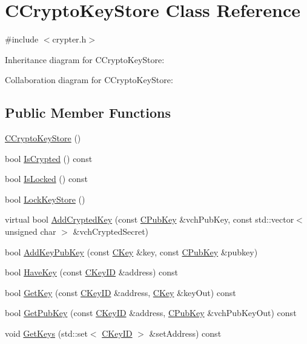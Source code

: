 \hypertarget{class_c_crypto_key_store}{}\section{C\+Crypto\+Key\+Store Class Reference}
\label{class_c_crypto_key_store}


{\ttfamily \#include $<$crypter.\+h$>$}



Inheritance diagram for C\+Crypto\+Key\+Store\+:


Collaboration diagram for C\+Crypto\+Key\+Store\+:
\subsection*{Public Member Functions}
\begin{DoxyCompactItemize}
\item 
\hyperlink{class_c_crypto_key_store_a7c7f1075182d42fcb0781d1dc7a876c3}{C\+Crypto\+Key\+Store} ()
\item 
bool \hyperlink{class_c_crypto_key_store_a1cb434078a9ea686c0acf168d2c81252}{Is\+Crypted} () const 
\item 
bool \hyperlink{class_c_crypto_key_store_a1c3ebef555fd13676d67509b95820fcf}{Is\+Locked} () const 
\item 
bool \hyperlink{class_c_crypto_key_store_ad967b2232dc6a2a8aef7a723296b44dc}{Lock\+Key\+Store} ()
\item 
virtual bool \hyperlink{class_c_crypto_key_store_a9f4d2df95008205b2b9784c5f0e8e12b}{Add\+Crypted\+Key} (const \hyperlink{class_c_pub_key}{C\+Pub\+Key} \&vch\+Pub\+Key, const std\+::vector$<$ unsigned char $>$ \&vch\+Crypted\+Secret)
\item 
bool \hyperlink{class_c_crypto_key_store_a340109b8673267676a34664a76ed3274}{Add\+Key\+Pub\+Key} (const \hyperlink{class_c_key}{C\+Key} \&key, const \hyperlink{class_c_pub_key}{C\+Pub\+Key} \&pubkey)
\item 
bool \hyperlink{class_c_crypto_key_store_a0cefe933dd3a6ac7744432493696bffc}{Have\+Key} (const \hyperlink{class_c_key_i_d}{C\+Key\+I\+D} \&address) const 
\item 
bool \hyperlink{class_c_crypto_key_store_a58cfb3c490318ef82de8fc9be6637269}{Get\+Key} (const \hyperlink{class_c_key_i_d}{C\+Key\+I\+D} \&address, \hyperlink{class_c_key}{C\+Key} \&key\+Out) const 
\item 
bool \hyperlink{class_c_crypto_key_store_abd897aff07ec5679235b14cb4485dc37}{Get\+Pub\+Key} (const \hyperlink{class_c_key_i_d}{C\+Key\+I\+D} \&address, \hyperlink{class_c_pub_key}{C\+Pub\+Key} \&vch\+Pub\+Key\+Out) const 
\item 
void \hyperlink{class_c_crypto_key_store_a4f13246f58b7edbaf125d603f7d0d4b4}{Get\+Keys} (std\+::set$<$ \hyperlink{class_c_key_i_d}{C\+Key\+I\+D} $>$ \&set\+Address) const 
\end{DoxyCompactItemize}
